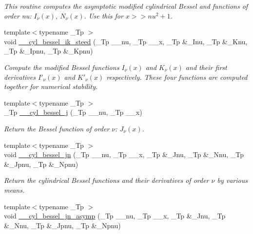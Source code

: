 \begin{DoxyCompactItemize}
\begin{DoxyCompactList}\small\item\em This routine computes the asymptotic modified cylindrical Bessel and functions of order nu\+: $ I_{\nu}(x) $, $ N_{\nu}(x) $. Use this for $ x >> nu^2 + 1 $. \end{DoxyCompactList}\item 
{\footnotesize template$<$typename \+\_\+\+Tp $>$ }\\void \hyperlink{namespacestd_1_1____detail_aed8927c2ec079a1831da66abcfae802b}{\+\_\+\+\_\+cyl\+\_\+bessel\+\_\+ik\+\_\+steed} (\+\_\+\+Tp \+\_\+\+\_\+nu, \+\_\+\+Tp \+\_\+\+\_\+x, \+\_\+\+Tp \&\+\_\+\+Inu, \+\_\+\+Tp \&\+\_\+\+Knu, \+\_\+\+Tp \&\+\_\+\+Ipnu, \+\_\+\+Tp \&\+\_\+\+Kpnu)
\begin{DoxyCompactList}\small\item\em Compute the modified Bessel functions $ I_\nu(x) $ and $ K_\nu(x) $ and their first derivatives $ I'_\nu(x) $ and $ K'_\nu(x) $ respectively. These four functions are computed together for numerical stability. \end{DoxyCompactList}\item 
{\footnotesize template$<$typename \+\_\+\+Tp $>$ }\\\+\_\+\+Tp \hyperlink{namespacestd_1_1____detail_a9909fc0c463a7f0b9259fe02e15fce55}{\+\_\+\+\_\+cyl\+\_\+bessel\+\_\+j} (\+\_\+\+Tp \+\_\+\+\_\+nu, \+\_\+\+Tp \+\_\+\+\_\+x)
\begin{DoxyCompactList}\small\item\em Return the Bessel function of order $ \nu $\+: $ J_{\nu}(x) $. \end{DoxyCompactList}\item 
{\footnotesize template$<$typename \+\_\+\+Tp $>$ }\\void \hyperlink{namespacestd_1_1____detail_ab53542ee39a31a43794a08a6cf008912}{\+\_\+\+\_\+cyl\+\_\+bessel\+\_\+jn} (\+\_\+\+Tp \+\_\+\+\_\+nu, \+\_\+\+Tp \+\_\+\+\_\+x, \+\_\+\+Tp \&\+\_\+\+Jnu, \+\_\+\+Tp \&\+\_\+\+Nnu, \+\_\+\+Tp \&\+\_\+\+Jpnu, \+\_\+\+Tp \&\+\_\+\+Npnu)
\begin{DoxyCompactList}\small\item\em Return the cylindrical Bessel functions and their derivatives of order $ \nu $ by various means. \end{DoxyCompactList}\item 
{\footnotesize template$<$typename \+\_\+\+Tp $>$ }\\void \hyperlink{namespacestd_1_1____detail_aba93a8a64d2f2409c2f2df0da7140c24}{\+\_\+\+\_\+cyl\+\_\+bessel\+\_\+jn\+\_\+asymp} (\+\_\+\+Tp \+\_\+\+\_\+nu, \+\_\+\+Tp \+\_\+\+\_\+x, \+\_\+\+Tp \&\+\_\+\+Jnu, \+\_\+\+Tp \&\+\_\+\+Nnu, \+\_\+\+Tp \&\+\_\+\+Jpnu, \+\_\+\+Tp \&\+\_\+\+Npnu)

\end{DoxyCompactItemize}
